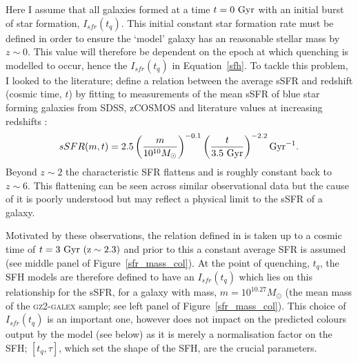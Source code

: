 Here I assume that all galaxies formed at a time $t=0~\rm{Gyr}$ with an initial burst of star formation, $I_{sfr}(t_q)$. This initial constant star formation rate must be defined in order to ensure the `model' galaxy  has an reasonable stellar mass by $z\sim0$. This value will therefore be dependent on the epoch at which quenching is modelled to occur, hence the $I_{sfr}(t_q)$ in Equation~\ref{sfh}. To tackle this problem, I looked to the literature; \citet[][Equation 1]{peng10} define a relation between the average sSFR and redshift (cosmic time, $t$) by fitting to measurements of the mean sSFR of blue star forming galaxies from SDSS, zCOSMOS and literature values at increasing redshifts \citep{Elbaz07, Daddi07}:
\begin{equation}\label{eq:peng}
sSFR(m,t) = 2.5 \left( \frac{m}{10^{10} M_{\odot}} \right)^{-0.1} \left(\frac{t}{3.5 ~\rm{Gyr}}\right)^{-2.2} \rm{Gyr}^{-1}.
\end{equation}
Beyond $z \sim 2$ the characteristic SFR flattens and is roughly constant back to $z\sim6$. This flattening can be seen across similar observational data \citep{peng10, gonzalez10, bethermin12} but the cause of it is poorly understood but may reflect a physical limit to the sSFR of a galaxy. 

Motivated by these observations, the relation defined in \citet{peng10} is taken up to a cosmic time of $t=3~\rm{Gyr}~(z \sim 2.3)$ and prior to this a constant average SFR is assumed (see middle panel of Figure~\ref{sfr_mass_col}). At the point of quenching, $t_{q}$, the SFH models are therefore defined to have an $I_{sfr}(t_q)$ which lies on this relationship for the sSFR, for a galaxy with mass, $m = 10^{10.27} M_{\odot}$ (the mean mass of the \textsc{gz2-galex} sample; see left panel of Figure~\ref{sfr_mass_col}). This choice of $I_{sfr}(t_q)$ is an important one, however does not impact on the predicted colours output by the model (see below) as it is merely a normalisation factor on the SFH; $[t_q, \tau]$, which set the shape of the SFH, are the crucial parameters. 

